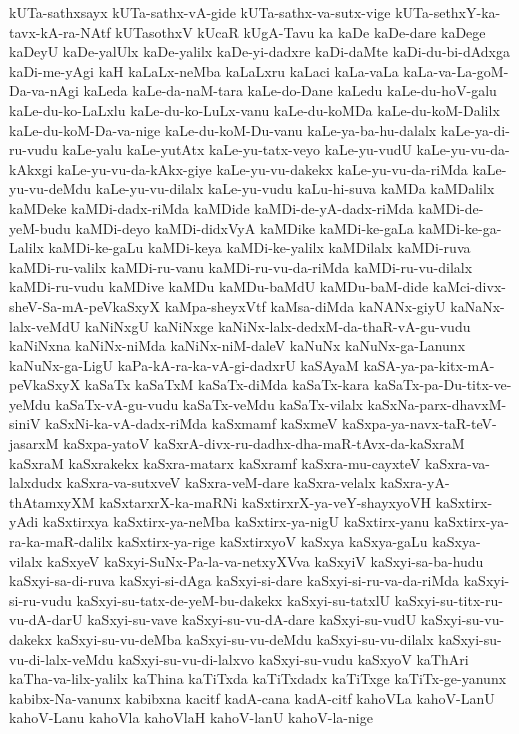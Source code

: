 {kUTa-sathxsayx
kUTa-sathx-vA-gide
kUTa-sathx-va-sutx-vige
kUTa-sethxY-ka-tavx-kA-ra-NAtf
kUTasothxV
kUcaR
kUgA-Tavu
ka
kaDe
kaDe-dare
kaDege
kaDeyU
kaDe-yalUlx
kaDe-yalilx
kaDe-yi-dadxre
kaDi-daMte
kaDi-du-bi-dAdxga
kaDi-me-yAgi
kaH
kaLaLx-neMba
kaLaLxru
kaLaci
kaLa-vaLa
kaLa-va-La-goM-Da-va-nAgi
kaLeda
kaLe-da-naM-tara
kaLe-do-Dane
kaLedu
kaLe-du-hoV-galu
kaLe-du-ko-LaLxlu
kaLe-du-ko-LuLx-vanu
kaLe-du-koMDa
kaLe-du-koM-Dalilx
kaLe-du-koM-Da-va-nige
kaLe-du-koM-Du-vanu
kaLe-ya-ba-hu-dalalx
kaLe-ya-di-ru-vudu
kaLe-yalu
kaLe-yutAtx
kaLe-yu-tatx-veyo
kaLe-yu-vudU
kaLe-yu-vu-da-kAkxgi
kaLe-yu-vu-da-kAkx-giye
kaLe-yu-vu-dakekx
kaLe-yu-vu-da-riMda
kaLe-yu-vu-deMdu
kaLe-yu-vu-dilalx
kaLe-yu-vudu
kaLu-hi-suva
kaMDa
kaMDalilx
kaMDeke
kaMDi-dadx-riMda
kaMDide
kaMDi-de-yA-dadx-riMda
kaMDi-de-yeM-budu
kaMDi-deyo
kaMDi-didxVyA
kaMDike
kaMDi-ke-gaLa
kaMDi-ke-ga-Lalilx
kaMDi-ke-gaLu
kaMDi-keya
kaMDi-ke-yalilx
kaMDilalx
kaMDi-ruva
kaMDi-ru-valilx
kaMDi-ru-vanu
kaMDi-ru-vu-da-riMda
kaMDi-ru-vu-dilalx
kaMDi-ru-vudu
kaMDive
kaMDu
kaMDu-baMdU
kaMDu-baM-dide
kaMci-divx-sheV-Sa-mA-peVkaSxyX
kaMpa-sheyxVtf
kaMsa-diMda
kaNANx-giyU
kaNaNx-lalx-veMdU
kaNiNxgU
kaNiNxge
kaNiNx-lalx-dedxM-da-thaR-vA-gu-vudu
kaNiNxna
kaNiNx-niMda
kaNiNx-niM-daleV
kaNuNx
kaNuNx-ga-Lanunx
kaNuNx-ga-LigU
kaPa-kA-ra-ka-vA-gi-dadxrU
kaSAyaM
kaSA-ya-pa-kitx-mA-peVkaSxyX
kaSaTx
kaSaTxM
kaSaTx-diMda
kaSaTx-kara
kaSaTx-pa-Du-titx-ve-yeMdu
kaSaTx-vA-gu-vudu
kaSaTx-veMdu
kaSaTx-vilalx
kaSxNa-parx-dhavxM-siniV
kaSxNi-ka-vA-dadx-riMda
kaSxmamf
kaSxmeV
kaSxpa-ya-navx-taR-teV-jasarxM
kaSxpa-yatoV
kaSxrA-divx-ru-dadhx-dha-maR-tAvx-da-kaSxraM
kaSxraM
kaSxrakekx
kaSxra-matarx
kaSxramf
kaSxra-mu-cayxteV
kaSxra-va-lalxdudx
kaSxra-va-sutxveV
kaSxra-veM-dare
kaSxra-velalx
kaSxra-yA-thAtamxyXM
kaSxtarxrX-ka-maRNi
kaSxtirxrX-ya-veY-shayxyoVH
kaSxtirx-yAdi
kaSxtirxya
kaSxtirx-ya-neMba
kaSxtirx-ya-nigU
kaSxtirx-yanu
kaSxtirx-ya-ra-ka-maR-dalilx
kaSxtirx-ya-rige
kaSxtirxyoV
kaSxya
kaSxya-gaLu
kaSxya-vilalx
kaSxyeV
kaSxyi-SuNx-Pa-la-va-netxyXVva
kaSxyiV
kaSxyi-sa-ba-hudu
kaSxyi-sa-di-ruva
kaSxyi-si-dAga
kaSxyi-si-dare
kaSxyi-si-ru-va-da-riMda
kaSxyi-si-ru-vudu
kaSxyi-su-tatx-de-yeM-bu-dakekx
kaSxyi-su-tatxlU
kaSxyi-su-titx-ru-vu-dA-darU
kaSxyi-su-vave
kaSxyi-su-vu-dA-dare
kaSxyi-su-vudU
kaSxyi-su-vu-dakekx
kaSxyi-su-vu-deMba
kaSxyi-su-vu-deMdu
kaSxyi-su-vu-dilalx
kaSxyi-su-vu-di-lalx-veMdu
kaSxyi-su-vu-di-lalxvo
kaSxyi-su-vudu
kaSxyoV
kaThAri
kaTha-va-lilx-yalilx
kaThina
kaTiTxda
kaTiTxdadx
kaTiTxge
kaTiTx-ge-yanunx
kabibx-Na-vanunx
kabibxna
kacitf
kadA-cana
kadA-citf
kahoVLa
kahoV-LanU
kahoV-Lanu
kahoVla
kahoVlaH
kahoV-lanU
kahoV-la-nige
}

